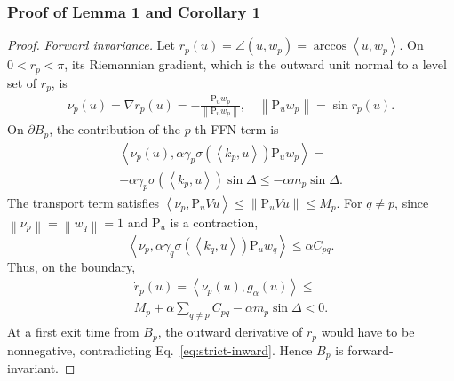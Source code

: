 \documentclass[11pt]{article}
\newcommand{\norm}[1]{\left\lVert #1 \right\rVert}
\newcommand{\ip}[2]{\left\langle #1,#2 \right\rangle}
\newcommand{\Proj}{\mathrm{P}}
\begin{document}
\subsubsection{Proof of Lemma 1 and Corollary 1}
\begin{proof}
\emph{Forward invariance.}
Let $r_p(u)=\angle(u,w_p)=\arccos\ip{u}{w_p}$. On $0<r_p<\pi$, its Riemannian
gradient, which is the outward unit normal to a level set of $r_p$, is
\begin{equation}
\begin{split}
\nu_p(u)=\nabla r_p(u)
=-\frac{\Proj_uw_p}{\norm{\Proj_uw_p}},
\quad
\norm{\Proj_uw_p}=\sin r_p(u).
\end{split}
\label{eq:normal}
\end{equation}
On $\partial B_p$, the contribution of the $p$-th FFN term is
\begin{equation}
\begin{split}
\ip{\nu_p(u)}
{\alpha\gamma_p\sigma(\ip{k_p}{u})\Proj_uw_p} =\\
-\alpha\gamma_p\sigma(\ip{k_p}{u})\sin\Delta \le-\alpha m_p\sin\Delta.
\end{split}
\end{equation}
The transport term satisfies
$\ip{\nu_p}{\Proj_uVu}\le\norm{\Proj_uVu}\le M_p$. For $q\ne p$, since
$\norm{\nu_p}=\norm{w_q}=1$ and $\Proj_u$ is a contraction,
\begin{equation}
\ip{\nu_p}
{\alpha\gamma_q\sigma(\ip{k_q}{u})\Proj_uw_q}
\le\alpha C_{pq}.
\end{equation}
Thus, on the boundary,
\begin{equation}
\begin{split}
\dot r_p(u)=\ip{\nu_p(u)}{g_\alpha(u)}
\le \\ M_p+\alpha\sum_{q\ne p}C_{pq}-\alpha m_p\sin\Delta<0.
\end{split}
\label{eq:strict-inward}
\end{equation}
At a first exit time from $B_p$, the outward derivative of $r_p$ would have to be
nonnegative, contradicting Eq.~\eqref{eq:strict-inward}. Hence $B_p$ is
forward-invariant.


\end{proof}
\end{document}
